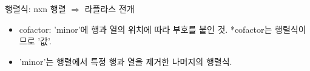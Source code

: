 \documentclass[aspectratio=169]{beamer}
\begin{document}
\begin{frame}{행렬식: nxn 행렬 $\Rightarrow$ 라플라스 전개}
  \begin{itemize}
    \begin{block}{라플라스 전개}
      행렬식을 '부분 행렬식(cofactor)'으로 나누어 계산
      \begin{align*}
        |A| & = a_{11}\cdot |C_{11}| + a_{12}\cdot |C_{12}| + \cdots +a_{1n}\cdot |C_{1n}| \\
            & = a_{11}\cdot |C_{11}| + a_{21}\cdot |C_{21}| + \cdots +a_{m1}\cdot |C_{m1}|, \\
        \text{cofactor}: & |C_{ij}| = (-1)^{i+j} |M_{ij}| ,\quad i:\text{행, } j:\text{열}
      \end{align*}
    \end{block}
    \item cofactor: 'minor'에 행과 열의 위치에 따라 부호를 붙인 것. *cofactor는 행렬식이므로 '값'.
    \item 'minor'는 행렬에서 특정 행과 열을 제거한 나머지의 행렬식.
  \end{itemize}
\end{frame}
\end{document}

